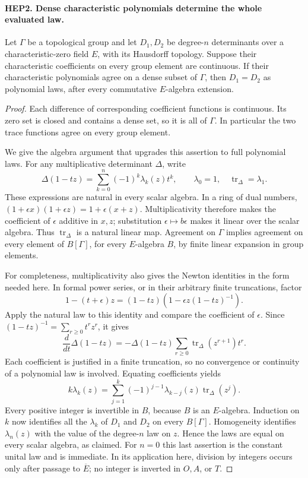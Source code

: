 \paragraph{HEP2. Dense characteristic polynomials determine the whole evaluated law.}
\label{claim:HEP2}
Let $\Gamma$ be a topological group and let $D_1,D_2$ be
degree-$n$ determinants over a characteristic-zero field $E$,
with its Hausdorff topology.  Suppose their characteristic
coefficients on every group element are continuous.  If their
characteristic polynomials agree on a dense subset of $\Gamma$,
then $D_1=D_2$ as polynomial laws, after every commutative
$E$-algebra extension.
\begin{proof}
Each difference of corresponding coefficient functions is continuous.
Its zero set is closed and contains a dense set, so it is all of
$\Gamma$.  In particular the two trace functions agree on every
group element.

We give the algebra argument that upgrades this assertion to full
polynomial laws.  For any multiplicative determinant $\Delta$,
write
\[
 \Delta(1-tz)=\sum_{k=0}^n(-1)^k\lambda_k(z)t^k,
 \qquad \lambda_0=1,\quad \operatorname{tr}_\Delta=\lambda_1.
 \tag{HEP.4}
\]
These expressions are natural in every scalar algebra.  In a ring
of dual numbers,
$(1+\epsilon x)(1+\epsilon z)=1+\epsilon(x+z)$.
Multiplicativity therefore makes the coefficient of $\epsilon$
additive in $x,z$; substitution $\epsilon\mapsto b\epsilon$
makes it linear over the scalar algebra.  Thus
$\operatorname{tr}_\Delta$ is a natural linear map.  Agreement on
$\Gamma$ implies agreement on every element of $B[\Gamma]$, for
every $E$-algebra $B$, by finite linear expansion in group elements.

For completeness, multiplicativity also gives the Newton identities
in the form needed here.  In formal power series, or in their
arbitrary finite truncations, factor
\[
 1-(t+\epsilon)z=(1-tz)
       \left(1-\epsilon z(1-tz)^{-1}\right).
\]
Apply the natural law to this identity and compare the coefficient
of $\epsilon$.  Since $(1-tz)^{-1}=\sum_{r\geq0}t^rz^r$, it gives
\[
 \frac{d}{dt}\Delta(1-tz)
   =-\Delta(1-tz)\sum_{r\geq0}
                        \operatorname{tr}_\Delta(z^{r+1})t^r.
\]
Each coefficient is justified in a finite truncation, so no
convergence or continuity of a polynomial law is involved.
Equating coefficients yields
\[
 k\lambda_k(z)=\sum_{j=1}^k(-1)^{j-1}
                   \lambda_{k-j}(z)\operatorname{tr}_\Delta(z^j).
 \tag{HEP.5}
\]
Every positive integer is invertible in $B$, because $B$ is an
$E$-algebra.  Induction on $k$ now identifies all the $\lambda_k$
of $D_1$ and $D_2$ on every $B[\Gamma]$.  Homogeneity identifies
$\lambda_n(z)$ with the value of the degree-$n$ law on $z$.
Hence the laws are equal on every scalar algebra, as claimed.
For $n=0$ this last assertion is the constant unital law and is
immediate.  In its application here, division by integers occurs
only after passage to $\overline E$; no integer is inverted in
$O,A$, or $T$.
\end{proof}

